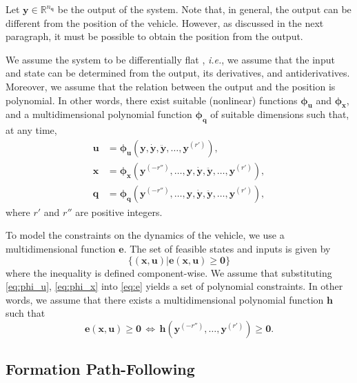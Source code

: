 Let $\bm{y} \in \mathbb{R}^{n_{\bm{q}}}$ be the output of the system.
Note that, in general, the output can be different from the position of the vehicle.
However, as discussed in the next paragraph, it must be possible to obtain the position from the output.

We assume the system to be differentially flat \cite{fliess_1995_flatness}, \emph{i.e.}, we assume that the input and state can be determined from the output, its derivatives, and antiderivatives. Moreover, we assume that the relation between the output and the position is polynomial.
In other words, there exist suitable (nonlinear) functions $\bm{\phi}_{\bm{u}}$ and $\bm{\phi}_{\bm{x}}$, and a multidimensional polynomial function $\bm{\phi}_{\bm{q}}$ of suitable dimensions such that, at any time,
%
\begin{align}
    \bm{u} &= \bm{\phi}_{\bm{u}} \left(\bm{y}, \dot{\bm{y}}, \ddot{\bm{y}}, \ldots, \bm{y}^{(r')}\right), \label{eq:phi_u} \\
    \bm{x} &= \bm{\phi}_{\bm{x}} \left(\bm{y}^{(-r'')}, \ldots, \bm{y}, \dot{\bm{y}}, \ddot{\bm{y}}, \ldots, \bm{y}^{(r')}\right), \label{eq:phi_x} \\ 
    \bm{q} &= \bm{\phi}_{\bm{q}} \left(\bm{y}^{(-r'')}, \ldots, \bm{y}, \dot{\bm{y}}, \ddot{\bm{y}}, \ldots, \bm{y}^{(r')}\right), \label{eq:phi_q}
\end{align}
%
where $r'$ and $r''$ are positive integers.

To model the constraints on the dynamics of the vehicle, we use a multidimensional function $\bm{e}$.
The set of feasible states and inputs is given by
\begin{equation}
    \big\{\left(\bm{x}, \bm{u}\right) \big| \bm{e} (\bm{x}, \bm{u}) \geq \bm{0}\big\}
    \label{eq:e}
\end{equation}
where the inequality is defined component-wise.
We assume that substituting \eqref{eq:phi_u}, \eqref{eq:phi_x} into \eqref{eq:e} yields a set of polynomial constraints.
In other words, we assume that there exists a multidimensional polynomial function $\bm{h}$ such that
\begin{equation}
    \bm{e} (\bm{x}, \bm{u})
    \geq
    \bm{0}
    \, \iff \,
    \bm{h} \left( \bm{y}^{(-r'')}, \ldots, \bm{y}^{(r')} \right)
    \geq
    \bm{0}.
\label{equ:constraint-h-geq-0}
\end{equation}



\subsection{Formation Path-Following}
\label{ssec:formation-path-following}



